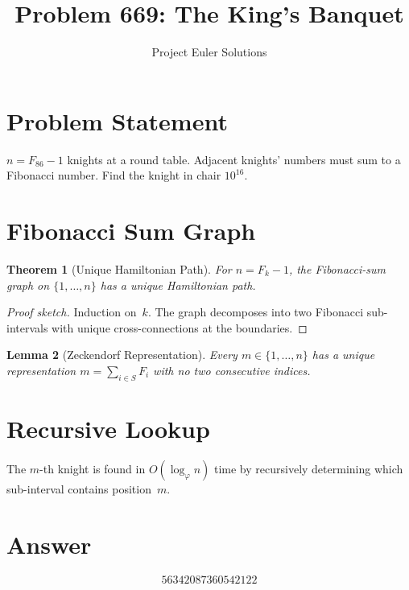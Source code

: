 \documentclass[11pt]{article}
\title{Problem 669: The King's Banquet}
\author{Project Euler Solutions}
\date{}
\newtheorem{theorem}{Theorem}
\newtheorem{lemma}[theorem]{Lemma}
\begin{document}
\maketitle

\section{Problem Statement}

$n = F_{86} - 1$ knights at a round table. Adjacent knights' numbers must sum to a Fibonacci number. Find the knight in chair $10^{16}$.

\section{Fibonacci Sum Graph}

\begin{theorem}[Unique Hamiltonian Path]
For $n = F_k - 1$, the Fibonacci-sum graph on $\{1,\ldots,n\}$ has a unique Hamiltonian path.
\end{theorem}

\begin{proof}[Proof sketch]
Induction on~$k$. The graph decomposes into two Fibonacci sub-intervals with unique cross-connections at the boundaries.
\end{proof}

\begin{lemma}[Zeckendorf Representation]
Every $m \in \{1,\ldots,n\}$ has a unique representation $m = \sum_{i \in S} F_i$ with no two consecutive indices.
\end{lemma}

\section{Recursive Lookup}

The $m$-th knight is found in $O(\log_\varphi n)$ time by recursively determining which sub-interval contains position~$m$.

\section{Answer}

\[
\boxed{56342087360542122}
\]
\end{document}

